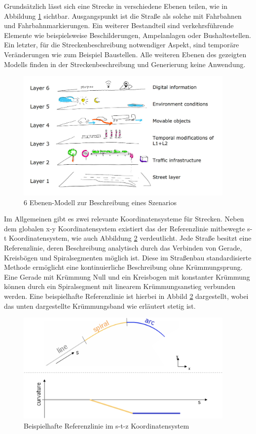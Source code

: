 Grundsätzlich lässt sich eine Strecke in verschiedene Ebenen teilen, wie in Abbildung \ref{abb1} sichtbar. Ausgangspunkt ist die Straße als solche mit Fahrbahnen und Fahrbahnmarkierungen. Ein weiterer Bestandteil sind verkehrsführende Elemente wie beispielsweise Beschilderungen, Ampelanlagen oder Bushaltestellen. Ein letzter, für die Streckenbeschreibung notwendiger Aspekt, sind temporäre Veränderungen wie zum Beispiel Baustellen. Alle weiteren Ebenen des gezeigten Modells finden in der Streckenbeschreibung und Generierung keine Anwendung.

\begin{figure}[H]
\flushleft
\includegraphics[width=0.95\textwidth]{fig/fig1.png}
\caption{6 Ebenen-Modell zur Beschreibung eines Szenarios \cite{Eckstein.2018}}
\label{abb1}
\end{figure}

Im Allgemeinen gibt es zwei relevante Koordinatensysteme für Strecken. Neben dem globalen x-y Koordinatensystem existiert das der Referenzlinie mitbewegte s-t Koordinatensystem, wie auch Abbildung \ref{abb2} verdeutlicht. Jede Straße besitzt eine Referenzlinie, deren Beschreibung analytisch durch das Verbinden von Gerade, Kreisbögen und Spiralsegmenten möglich ist. Diese im Straßenbau standardisierte Methode ermöglicht eine kontinuierliche Beschreibung ohne Krümmungsprung. Eine Gerade mit Krümmung Null und ein Kreisbogen mit konstanter Krümmung können durch ein Spiralsegment mit linearem Krümmungsanstieg verbunden werden. Eine beispielhafte Referenzlinie ist hierbei in Abbild \ref{abb2} dargestellt, wobei das unten dargestellte Krümmungsband wie erläutert stetig ist.

\begin{figure}[H]
\flushleft
\includegraphics[width=0.95\textwidth]{fig/fig2.png}
\caption{Beispielhafte Referenzlinie im s-t-z Koordinatensystem \cite{Becker.2017}}
\label{abb2}
\end{figure}

